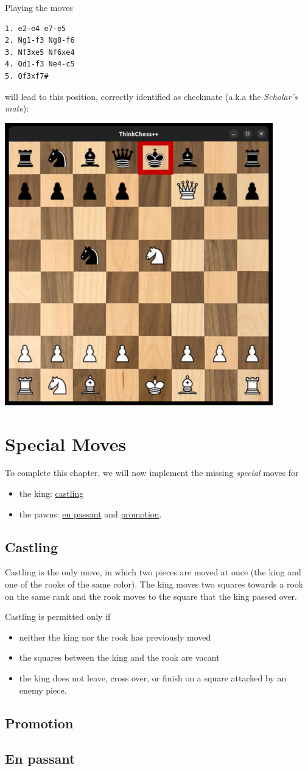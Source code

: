 Playing the moves
\begin{verbatim}
1. e2-e4 e7-e5
2. Ng1-f3 Ng8-f6
3. Nf3xe5 Nf6xe4
4. Qd1-f3 Ne4-c5
5. Qf3xf7#
\end{verbatim}

will lead to this position, correctly identified as checkmate (a.k.a
the \emph{Scholar's mate}):

\begin{center}
\includegraphics[width=.5\linewidth]{img/checkmate.jpg}
\end{center}

\section{Special Moves}\label{sec:specmoves}

To complete this chapter, we will now implement the missing \emph{special} moves for
\begin{itemize}
  \item the king: \href{https://en.wikipedia.org/wiki/Castling}{castling}
  \item the pawns: \href{https://en.wikipedia.org/wiki/En_passant}{en passant} and
    \href{https://en.wikipedia.org/wiki/Promotion_(chess)}{promotion}.
\end{itemize}

\subsection{Castling}

Castling is the only move, in which two pieces are moved at once (the king and one
of the rooks of the same color).
The king moves two squares towards a rook on the same rank and the rook moves to the square
that the king passed over.

Castling is permitted only if
\begin{itemize}
  \item neither the king nor the rook has previously moved
  \item the squares between the king and the rook are vacant
  \item the king does not leave, cross over, or finish on a square attacked by an enemy piece.
\end{itemize}

\subsection{Promotion}

\subsection{En passant}

